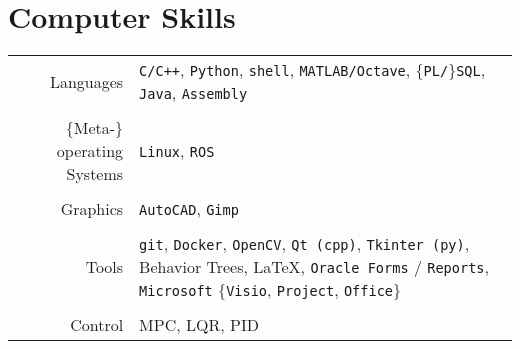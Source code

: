 \documentclass[a4paper,10pt,twoside]{article}
\begin{document}








\section{Computer Skills}

\begin{tabular}{rp{9cm}}
  Languages & \texttt{C/C++}, \texttt{Python}, \texttt{shell}, \texttt{MATLAB/Octave}, $\{$\texttt{PL/}$\}$\texttt{SQL}, \texttt{Java}, \texttt{Assembly}\\
&\\
  $\{$Meta-$\}$operating Systems & \texttt{Linux}, \texttt{ROS} \\
&\\
  Graphics & \texttt{AutoCAD}, \texttt{Gimp}\\
&\\
  Tools & \texttt{git}, \texttt{Docker}, \texttt{OpenCV}, \texttt{Qt (cpp)}, \texttt{Tkinter (py)}, Behavior Trees, \LaTeX, \texttt{Oracle Forms} / \texttt{Reports}, \texttt{Microsoft} $\{$\texttt{Visio}, \texttt{Project}, \texttt{Office}$\}$ \\
&\\
  Control & MPC, LQR, PID
\end{tabular}\\
\end{document}
